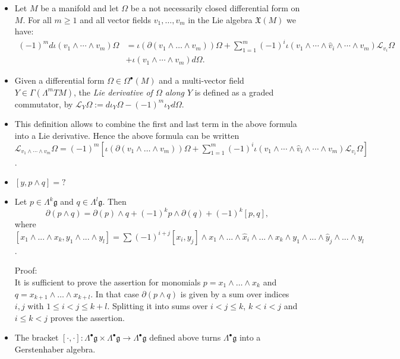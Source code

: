 \documentclass[a4paper,12pt]{scrartcl}
\newcommand{\g}{\ensuremath{\mathfrak{g}}}
\begin{document}
	\begin{itemize}
		\item
			Let $M$ be a manifold and let $\Omega$ be a not necessarily closed differential form on $M$. For all $m \geq 1$ and all vector fields $v_1,\dots,v_m$ in the Lie algebra $\mathfrak X(M)$ we have:
			\begin{align*} 
			(-1)^{m}d \iota(v_{1} \wedge\cdots \wedge v_{m}) \Omega &= 
			\iota(\partial(v_{1}\wedge\ldots\wedge v_{m}))\Omega
			+\sum_{1=1}^{m} (-1)^{i} \iota( v_{1} \wedge \cdots
			 \wedge \hat{v}_{i} \wedge \cdots \wedge {v}_{m})\mathcal{L}_{v_i}\Omega\\
			&+ \iota( v_{1} \wedge \cdots
			 \wedge {v}_{m}) d\Omega.
			\end{align*}	
		\item
			Given a differential form $\Omega\in \Omega^\bullet(M)$ and a multi-vector field $Y\in \Gamma(\Lambda^m TM)$, the \emph{Lie derivative of $\Omega$ along $Y$} is defined as a graded commutator,
			by $\mathcal{L}_Y\Omega:=d\iota_Y\Omega-(-1)^m\iota_Yd\Omega$.	
		\item
			This definition allows to combine the first and last term in the above formula into a Lie derivative.
			Hence the above formula can be written 
			$\mathcal{L}_{v_{1} \wedge \cdots
			\wedge {v}_{m}}\Omega 
			=(-1)^m[
			\iota(\partial(v_{1}\wedge\ldots\wedge v_{m}))\Omega+\sum_{1=1}^{m} (-1)^{i} \iota( v_{1} \wedge \cdots
			 \wedge \hat{v}_{i} \wedge \cdots \wedge {v}_{m})\mathcal{L}_{v_i}\Omega]$.	
		
		\item
			$[y, p \wedge q ] = ?$
		\item		
			Let $p\in \Lambda^k\g$ and $q\in\Lambda^l\g$. Then
			$$\partial(p\wedge q)=\partial(p)\wedge q+ (-1)^k p\wedge \partial(q)+(-1)^k[p,q],$$
			where $[x_1\wedge...\wedge x_k,y_1\wedge ...\wedge y_l]=\sum (-1)^{i+j}[x_i,y_j]\wedge x_1 \wedge ...\wedge \hat x_i\wedge ...\wedge x_k \wedge y_1 \wedge ...\wedge \hat y_j\wedge ...\wedge y_l$. 
			
			Proof:\\
			It is sufficient to prove the assertion for monomials
			$p= x_1\wedge\ldots\wedge x_k$ and $q=x_{k+1}\wedge\ldots\wedge x_{k+l}$.
			In that case $\partial(p\wedge q)$ is given by a 
			sum over indices $i,j$ with ${1 \leq i < j \leq k+l}$. Splitting it into sums over ${ i < j \leq k}$, ${k< i < j }$ and $ i \leq k < j$ proves the assertion.
		\item
			The bracket $[\cdot,\cdot]:\Lambda^\bullet\mathfrak g\times \Lambda^\bullet\mathfrak g\to \Lambda^\bullet\mathfrak g$ defined above turns $\Lambda^\bullet\mathfrak g$ into a Gerstenhaber algebra.


\end{itemize}
\end{document}
